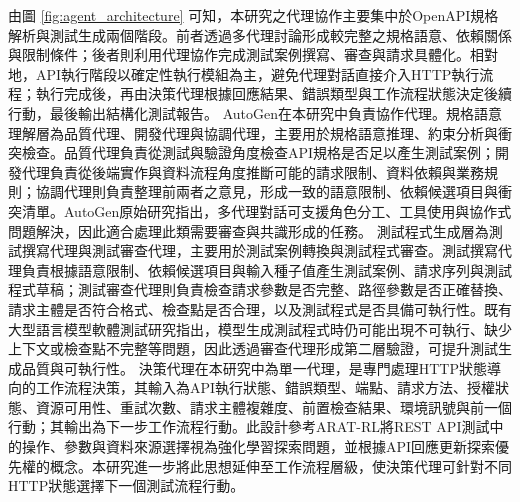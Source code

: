 \begin{ZhChapter}
\text 由圖 \ref{fig:agent_architecture} 可知，本研究之代理協作主要集中於OpenAPI規格解析與測試生成兩個階段。前者透過多代理討論形成較完整之規格語意、依賴關係與限制條件；後者則利用代理協作完成測試案例撰寫、審查與請求具體化。相對地，API執行階段以確定性執行模組為主，避免代理對話直接介入HTTP執行流程；執行完成後，再由決策代理根據回應結果、錯誤類型與工作流程狀態決定後續行動，最後輸出結構化測試報告。
\text AutoGen在本研究中負責協作代理。規格語意理解層為品質代理、開發代理與協調代理，主要用於規格語意推理、約束分析與衝突檢查。品質代理負責從測試與驗證角度檢查API規格是否足以產生測試案例；開發代理負責從後端實作與資料流程角度推斷可能的請求限制、資料依賴與業務規則；協調代理則負責整理前兩者之意見，形成一致的語意限制、依賴候選項目與衝突清單。AutoGen原始研究指出，多代理對話可支援角色分工、工具使用與協作式問題解決，因此適合處理此類需要審查與共識形成的任務\parencite{Wu2023AutoGen}。
\text 測試程式生成層為測試撰寫代理與測試審查代理，主要用於測試案例轉換與測試程式審查。測試撰寫代理負責根據語意限制、依賴候選項目與輸入種子值產生測試案例、請求序列與測試程式草稿；測試審查代理則負責檢查請求參數是否完整、路徑參數是否正確替換、請求主體是否符合格式、檢查點是否合理，以及測試程式是否具備可執行性。既有大型語言模型軟體測試研究指出，模型生成測試程式時仍可能出現不可執行、缺少上下文或檢查點不完整等問題，因此透過審查代理形成第二層驗證，可提升測試生成品質與可執行性\parencite{Wang2024Software, Anonymous2023LLMGenerators}。
\text 決策代理在本研究中為單一代理，是專門處理HTTP狀態導向的工作流程決策，其輸入為API執行狀態、錯誤類型、端點、請求方法、授權狀態、資源可用性、重試次數、請求主體複雜度、前置檢查結果、環境訊號與前一個行動；其輸出為下一步工作流程行動。此設計參考ARAT-RL將REST API測試中的操作、參數與資料來源選擇視為強化學習探索問題，並根據API回應更新探索優先權的概念\parencite{Kim2023Adaptive}。本研究進一步將此思想延伸至工作流程層級，使決策代理可針對不同HTTP狀態選擇下一個測試流程行動。


\end{ZhChapter}
